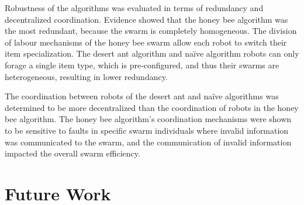 Robustness of the algorithms was evaluated in terms of redundancy and decentralized coordination. Evidence showed that the honey bee algorithm was the most redundant, because the swarm is completely homogeneous. The division of labour mechanisms of the honey bee swarm allow each robot to switch their item specialization. The desert ant algorithm and na\"ive algorithm robots can only forage a single item type, which is pre-configured, and thus their swarms are heterogeneous, resulting in lower redundancy.

The coordination between robots of the desert ant and na\"ive algorithms was determined to be more decentralized than the coordination of robots in the honey bee algorithm. The honey bee algorithm's coordination mechanisms were shown to be sensitive to faults in specific swarm individuals where invalid information was communicated to the swarm, and the communication of invalid information impacted the overall swarm efficiency. 



\section{Future Work}
\label{sec:conclusions:future_work}



